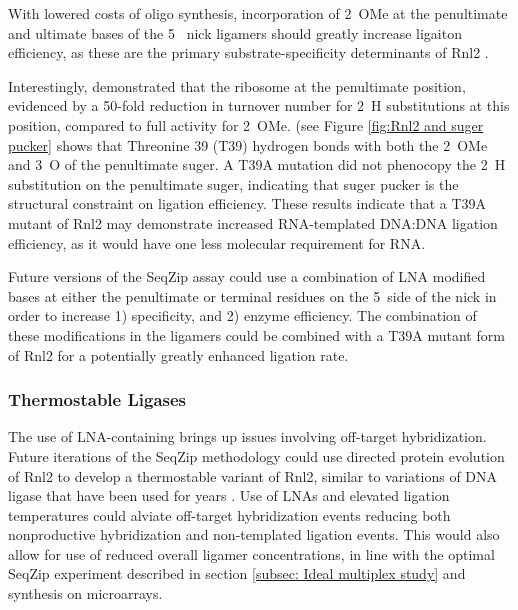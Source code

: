     With lowered costs of oligo synthesis, incorporation of 2\textprime~OMe at the penultimate and ultimate bases of the 5\textprime~ nick ligamers should greatly increase ligaiton efficiency, as these are the primary substrate-specificity determinants of Rnl2 \citep{Nandakumar2004a, Nandakumar2006}.

    Interestingly, \citet{Nandakumar2004a} demonstrated that the ribosome at the penultimate position, evidenced by a 50-fold reduction in turnover number for 2\textprime~H substitutions at this position, compared to full activity for 2\textprime~OMe. \citet{Nandakumar2006} (see Figure \ref{fig:Rnl2 and suger pucker} shows that Threonine 39 (T39) hydrogen bonds with both the 2\textprime~OMe and 3\textprime~O of the penultimate suger. A T39A mutation did not phenocopy the 2\textprime~H substitution on the penultimate suger, indicating that suger pucker is the structural constraint on ligation efficiency. These results indicate that a T39A mutant of Rnl2 may demonstrate increased RNA-templated DNA:DNA ligation efficiency, as it would have one less molecular requirement for RNA.

    Future versions of the SeqZip assay could use a combination of LNA modified bases \citep{You2006} at either the penultimate or terminal residues on the 5\textprime~side of the nick in order to increase 1) specificity, and 2) enzyme efficiency. The combination of these modifications in the ligamers could be combined with a T39A mutant form of Rnl2 for a potentially greatly enhanced ligation rate.

  \subsubsection{Thermostable Ligases}

    The use of LNA-containing brings up issues involving off-target hybridization. Future iterations of the SeqZip methodology could use directed protein evolution of Rnl2 \citep{Stemmer1994, Romero2009a} to develop a thermostable variant of Rnl2, similar to variations of DNA ligase that have been used for years \citep{Barany1991}. Use of LNAs and elevated ligation temperatures could alviate off-target hybridization events reducing both nonproductive hybridization and non-templated ligation events. This would also allow for use of reduced overall ligamer concentrations, in line with the optimal SeqZip experiment described in section \ref{subsec: Ideal multiplex study} and synthesis on microarrays.

